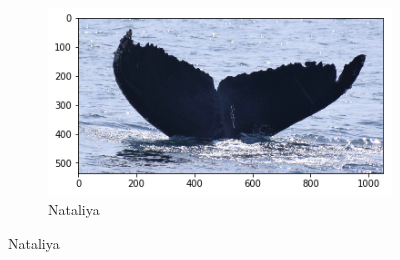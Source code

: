 \begin{frame}[c]
\begin{figure}
\begin{subfigure}[b]{0.24\linewidth}
            \centering
            \includegraphics[width=\linewidth]{Whales/w_f6c5343.png}
            \caption{Nataliya}
        \end{subfigure}
    \end{figure}
\end{frame}

